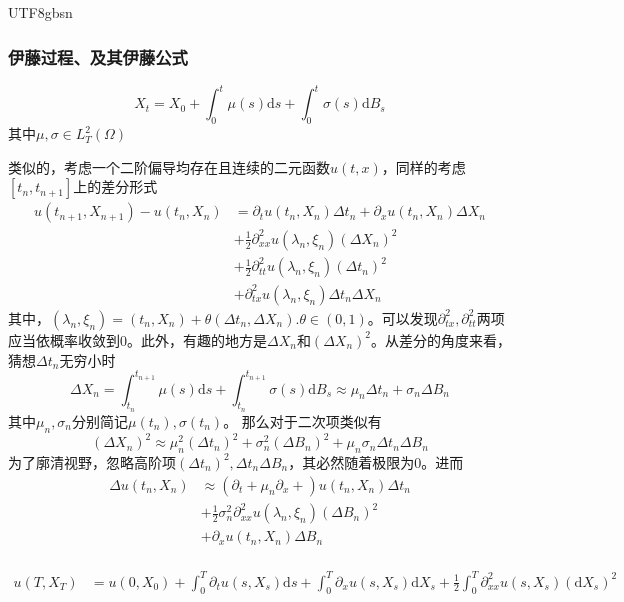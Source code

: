\documentclass{article}
\begin{document}
\begin{CJK*}{UTF8}{gbsn}
\subsubsection{伊藤过程、及其伊藤公式}
\begin{definition}[伊藤过程]
    \begin{equation}
    X_t=X_0+\int_0^t\mu(s)\mathrm{d}s+\int_0^t\sigma(s)\mathrm{d}B_s
    \label{ito pro}
    \end{equation}
    其中$\mu,\sigma\in L^2_T(\Omega)$
\end{definition}

类似的，考虑一个二阶偏导均存在且连续的二元函数$u(t,x)$，同样的考虑$[t_n,t_{n+1}]$上的差分形式
$$
\begin{aligned}
    u(t_{n+1},X_{n+1})-u(t_{n},X_{n})
    &=\partial_tu(t_{n},X_{n})\Delta t_n+\partial_xu(t_{n},X_{n})\Delta X_n\\
    &+\frac{1}{2}\partial_{xx}^2u(\lambda_n,\xi_n)(\Delta X_n)^2\\
    &+\frac{1}{2}\partial_{tt}^2u(\lambda_n,\xi_n)(\Delta t_n)^2\\
    &+\partial_{tx}^2u(\lambda_n,\xi_n)\Delta t_n\Delta X_n
\end{aligned}
$$
其中，$(\lambda_n,\xi_n)=(t_n,X_n)+\theta(\Delta t_n,\Delta X_n).\theta\in(0,1)$。可以发现$\partial_{tx}^2,\partial_{tt}^2$两项应当依概率收敛到$0$。此外，有趣的地方是$\Delta X_n$和$(\Delta X_n)^2$。从差分的角度来看，猜想$\Delta t_n$无穷小时
$$
\Delta X_n=\int_{t_n}^{t_{n+1}}\mu(s)\mathrm{d}s+\int_{t_n}^{t_{n+1}}\sigma(s)\mathrm{d}B_s
\approx\mu_n\Delta t_n+\sigma_n\Delta B_n
$$
其中$\mu_n,\sigma_n$分别简记$\mu(t_n),\sigma(t_n)$。
那么对于二次项类似有
$$
(\Delta X_n)^2
\approx\mu_n^2(\Delta t_n)^2+\sigma_n^2(\Delta B_n)^2+\mu_n\sigma_n\Delta t_n\Delta B_n
$$
为了廓清视野，忽略高阶项$(\Delta t_n)^2,\Delta t_n\Delta B_n$，其必然随着极限为$0$。进而
$$
\begin{aligned}
    \Delta u(t_n,X_n)
    &\approx(\partial_t+\mu_n\partial_x+)u(t_{n},X_{n})\Delta t_n\\ 
    &+\frac{1}{2}\sigma^2_n\partial_{xx}^2u(\lambda_{n},\xi_{n})(\Delta B_n)^2\\
    &+\partial_xu(t_{n},X_{n})\Delta B_n\\
\end{aligned}
$$
\begin{theorem}[关于伊藤过程的伊藤公式]
    $$
    \begin{aligned}
    u(T,X_T)
    &=u(0,X_0)+\int_0^T \partial_tu(s,X_s)\mathrm{d}s+\int_0^T\partial_xu(s,X_s)\mathrm{d}X_s+\frac{1}{2}\int_0^T\partial^2_{xx}u(s,X_s)(\mathrm{d}X_s)^2\\

\end{aligned}$$
\end{theorem}
\end{CJK*}
\end{document}
